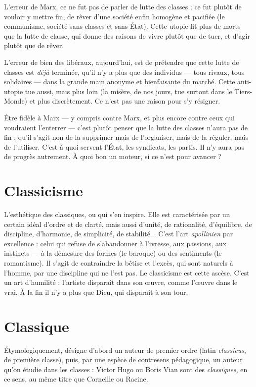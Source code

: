L'erreur de Marx, ce ne fut pas de parler de lutte des classes ; ce fut plutôt
de vouloir y mettre fin, de rêver d’une société enfin homogène et pacifiée (le
communisme, société sans classes et sans État). Cette utopie fit plus de morts
que la lutte de classe, qui donne des raisons de vivre plutôt que de tuer, et d’agir
plutôt que de rêver.

L'erreur de bien des libéraux, aujourd’hui, est de prétendre que cette lutte
de classes est {\it déjà} terminée, qu’il n’y a plus que des individus — tous rivaux,
tous solidaires — dans la grande main anonyme et bienfaisante du marché.
Cette anti-utopie tue aussi, mais plus loin (la misère, de nos jours, tue surtout
dans le Tiers-Monde) et plus discrètement. Ce n’est pas une raison pour s’y
résigner.

Être fidèle à Marx — y compris contre Marx, et plus encore contre ceux qui
voudraient l’enterrer — c’est plutôt penser que la lutte des classes n’aura pas de
fin : qu’il s’agit non de la supprimer mais de l’organiser, mais de la réguler,
mais de l'utiliser. C’est à quoi servent l’État, les syndicats, les partis. Il n’y aura
pas de progrès autrement. À quoi bon un moteur, si ce n’est pour avancer ?

\section{Classicisme}
L’esthétique des classiques, ou qui s’en inspire. Elle est
caractérisée par un certain idéal d’ordre et de clarté, mais
aussi d'unité, de rationalité, d'équilibre, de discipline, d'harmonie, de simplicité,
de stabilité... C’est l’art {\it apollinien} par excellence : celui qui refuse de
s’abandonner à l'ivresse, aux passions, aux instincts — à la démesure des formes
(le baroque) ou des sentiments (le romantisme). Il s’agit de contraindre la
bêtise et l’excès, qui sont naturels à l’homme, par une discipline qui ne l’est pas.
Le classicisme est cette ascèse. C’est un art d’humilité : l’artiste disparaît dans
son œuvre, comme l’œuvre dans le vrai. À la fin il n’y a plus que Dieu, qui disparaît
à son tour.

\section{Classique}
Étymologiquement, désigne d’abord un auteur de premier ordre
(latin {\it classicus}, de première classe), puis, par une espèce de
contresens pédagogique, un auteur qu’on étudie dans les classes : Victor Hugo
ou Boris Vian sont des {\it classiques}, en ce sens, au même titre que Corneille ou
Racine.

